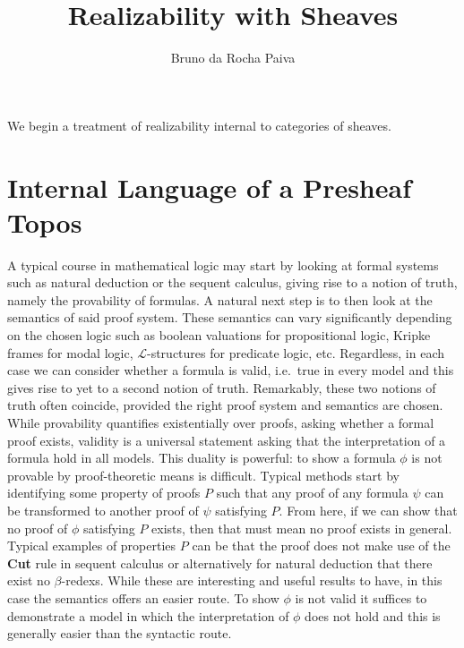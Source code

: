 \documentclass[11pt]{article}
\begin{document}
\title{Realizability with Sheaves}
\author{Bruno da Rocha Paiva}
\maketitle

We begin a treatment of realizability internal to categories of sheaves.

\newpage
\section{Internal Language of a Presheaf Topos}

A typical course in mathematical logic may start by looking at formal systems
such as natural deduction or the sequent calculus, giving rise to a notion of
truth, namely the provability of formulas. A natural next step is to then look
at the semantics of said proof system. These semantics can vary significantly
depending on the chosen logic such as boolean valuations for propositional
logic, Kripke frames for modal logic, \(\mathcal{L}\)-structures for predicate
logic, etc. Regardless, in each case we can consider whether a formula is valid,
i.e.\ true in every model and this gives rise to yet to a second notion of
truth. Remarkably, these two notions of truth often coincide, provided the right
proof system and semantics are chosen. While provability quantifies
existentially over proofs, asking whether a formal proof exists, validity is a
universal statement asking that the interpretation of a formula hold in all
models. This duality is powerful: to show a formula \(\phi\) is not provable by
proof-theoretic means is difficult. Typical methods start by identifying some
property of proofs \(P\) such that any proof of any formula \(\psi\) can be
transformed to another proof of \(\psi\) satisfying \(P\). From here, if we can
show that no proof of \(\phi\) satisfying \(P\) exists, then that must mean no
proof exists in general. Typical examples of properties \(P\) can be that the
proof does not make use of the \textbf{Cut} rule in sequent calculus or
alternatively for natural deduction that there exist no \(\beta\)-redexs. While
these are interesting and useful results to have, in this case the semantics
offers an easier route. To show \(\phi\) is not valid it suffices to demonstrate
a model in which the interpretation of \(\phi\) does not hold and this is
generally easier than the syntactic route.
\end{document}

